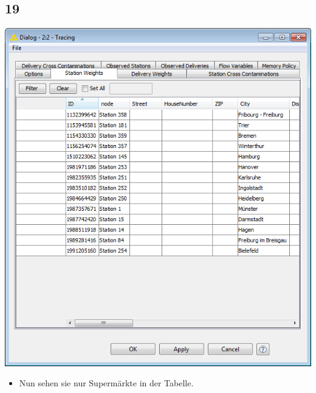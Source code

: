 \documentclass{beamer}
\begin{document}
\subsection{19}
\begin{frame}
	\begin{center}
  		\includegraphics[height=0.6\textheight]{19.png}
	\end{center}
	\begin{itemize}
		\item Nun sehen sie nur Supermärkte in der Tabelle.
	\end{itemize}
\end{frame}
\end{document}
